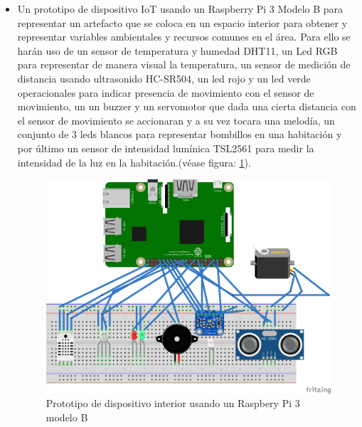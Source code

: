 \begin{itemize}
\item Un prototipo de dispositivo IoT usando un Raspberry Pi 3 Modelo B para representar un artefacto que se coloca en un espacio interior para obtener y representar variables ambientales y recursos comunes en el área. Para ello se harán uso de un sensor de temperatura y humedad DHT11, un Led RGB para representar de manera visual la temperatura, un sensor de medición de distancia usando ultrasonido HC-SR504, un led rojo y un led verde operacionales para indicar presencia de movimiento con el sensor de movimiento, un un buzzer y un servomotor que dada una cierta distancia con el sensor de movimiento se accionaran y a su vez tocara una melodía, un conjunto de 3 leds blancos para representar bombillos en una habitación y por último un sensor de intensidad lumínica TSL2561 para medir la intensidad de la luz en la habitación.(véase figura: \ref{fig:rpi3javier}).
\begin{figure}[htb]
\centering
\includegraphics[scale=0.5]{./Figuras/rpi3javier.png}
\caption{Prototipo de dispositivo interior usando un Raspbery Pi 3 modelo B}
\label{fig:rpi3javier}
\vspace*{-10pt}
\end{figure}


\end{itemize}
